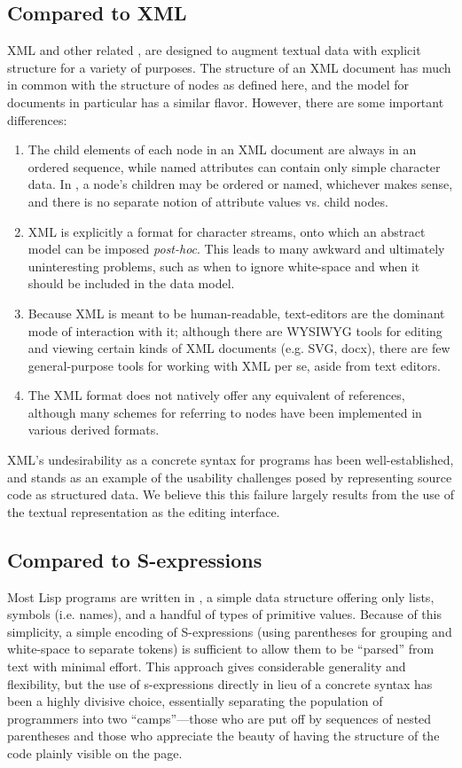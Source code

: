 \subsection{Compared to XML}
XML and other related , are designed to augment textual data with explicit structure for a variety of purposes. The structure of an XML document has much in common with the structure of nodes as defined here, and the \cite{infoset} model for documents in particular has a similar flavor. However, there are some important differences:
\begin{enumerate}
\item The child elements of each node in an XML document are always in an ordered sequence, while named attributes can contain only simple character data. In \Meta, a node's children may be ordered or named, whichever makes sense, and there is no separate notion of attribute values vs. child nodes.
\item XML is explicitly a format for character streams, onto which an abstract model can be imposed \textit{post-hoc}. This leads to many awkward and ultimately uninteresting problems, such as when to ignore white-space and when it should be included in the data model.
\item Because XML is meant to be human-readable, text-editors are the dominant mode of interaction with it; although there are WYSIWYG tools for editing and viewing certain kinds of XML documents (e.g. SVG\cite{svg}, docx\cite{openoffice}), there are few general-purpose tools for working with XML per se, aside from text editors.
\item The XML format does not natively offer any equivalent of references, although many schemes for referring to nodes have been implemented in various derived formats.
\end{enumerate}

XML's undesirability as a concrete syntax for programs has been well-established, and stands as an example of the usability challenges posed by representing source code as structured data\cite{?}. We believe this this failure largely results from the use of the textual representation as the editing interface.

\subsection{Compared to S-expressions}
Most Lisp programs are written in , a simple data structure offering only lists, symbols (i.e. names), and a handful of types of primitive values. Because of this simplicity, a simple encoding of S-expressions (using parentheses for grouping and white-space to separate tokens) is sufficient to allow them to be ``parsed'' from text with minimal effort. This approach gives considerable generality and flexibility, but the use of s-expressions directly in lieu of a concrete syntax has been a highly divisive choice, essentially separating the population of programmers into two ``camps''---those who are put off by sequences of nested parentheses and those who appreciate the beauty of having the structure of the code plainly visible on the page\cite{?}.

